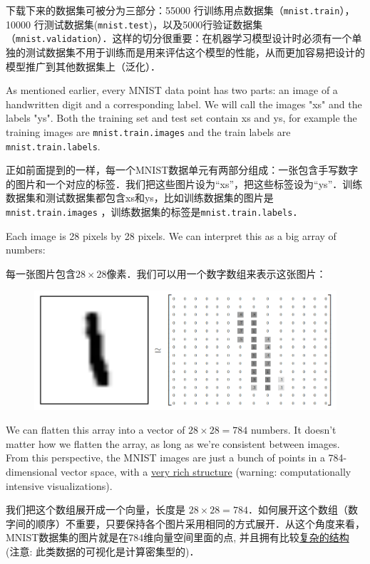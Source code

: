 下载下来的数据集可被分为三部分：55000 行训练用点数据集（\lstinline{mnist.train}），10000 行测试数据集(\lstinline{mnist.test})，以及5000行验证数据集（\lstinline{mnist.validation}）．这样的切分很重要：在机器学习模型设计时必须有一个单独的测试数据集不用于训练而是用来评估这个模型的性能，从而更加容易把设计的模型推广到其他数据集上（泛化）．

As mentioned earlier, every MNIST data point has two parts: an image of a handwritten digit and a corresponding label. We will call the images "xs" and the labels "ys". Both the training set and test set contain xs and ys, for example the training images are \lstinline{mnist.train.images} and the train labels are \lstinline{mnist.train.labels}.

正如前面提到的一样，每一个MNIST数据单元有两部分组成：一张包含手写数字的图片和一个对应的标签．我们把这些图片设为“xs”，把这些标签设为“ys”．训练数据集和测试数据集都包含xs和ys，比如训练数据集的图片是\lstinline{mnist.train.images} ，训练数据集的标签是\lstinline{mnist.train.labels}．

Each image is 28 pixels by 28 pixels. We can interpret this as a big array of numbers:

每一张图片包含$ 28 \times 28$像素．我们可以用一个数字数组来表示这张图片：

\begin{figure}[htbp]
\centering
\includegraphics[width=.8\textwidth]{../SOURCE/images/MNIST-Matrix.png}
\caption{}
\end{figure}

We can flatten this array into a vector of $ 28 \times 28 = 784$ numbers. It doesn't matter how we flatten the array, as long as we're consistent between images. From this perspective, the MNIST images are just a bunch of points in a 784-dimensional vector space, with a \href{http://colah.github.io/posts/2014-10-Visualizing-MNIST/}{very rich structure} (warning: computationally intensive visualizations).

我们把这个数组展开成一个向量，长度是 $ 28 \times 28 = 784$．如何展开这个数组（数字间的顺序）不重要，只要保持各个图片采用相同的方式展开．从这个角度来看，MNIST数据集的图片就是在784维向量空间里面的点, 并且拥有比较\href{http://colah.github.io/posts/2014-10-Visualizing-MNIST/}{复杂的结构} (注意: 此类数据的可视化是计算密集型的)．

